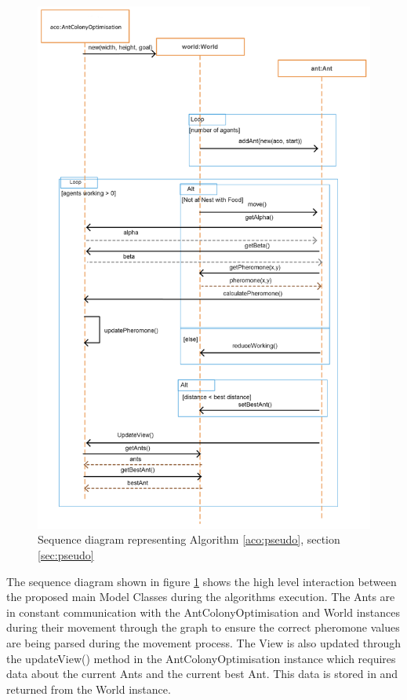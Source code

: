 \clearpage
\begin{figure}
\includegraphics[scale = 0.3]{Images/design/sequenceRes}
\caption{Sequence diagram representing Algorithm \ref{aco:pseudo}, section \ref{sec:pseudo}}
\label{fig:seq}
\end{figure}
\clearpage

The sequence diagram shown in figure \ref{fig:seq} shows the high level interaction between the proposed main Model Classes during the algorithms execution. The Ants are in constant communication with the AntColonyOptimisation and World instances during their movement through the graph to ensure the correct pheromone values are being parsed during the movement process. The View is also updated through the updateView() method in the AntColonyOptimisation instance which requires data about the current Ants and the current best Ant. This data is stored in and returned from the World instance.

